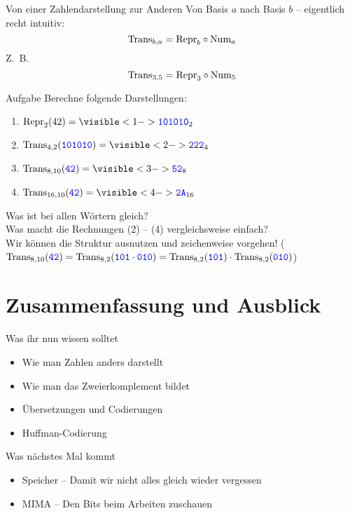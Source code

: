 \begin{frame}{Von einer Zahlendarstellung zur Anderen}
	\vspace{-.2\baselineskip}
	Von Basis $a$ nach Basis $b$ -- eigentlich recht intuitiv:
	$$\text{Trans}_{b,a} = \text{Repr}_b \circ {\text{Num}}_a$$
	Z.~B.
	$$\text{Trans}_{3,5} = \text{Repr}_3 \circ {\text{Num}}_5$$
	
	\begin{block}{Aufgabe}
		Berechne folgende Darstellungen:\\
		\begin{enumerate}[(1)]
			\item $\fRepr_2(42) = \visible<1->{ \word{101010}_2}$ 
			\item $\fTrans_{4,2}(\word{101010}) = \visible<2->{ \word{222}_4}$ 
			\item $\fTrans_{8,10}(\word{42}) = \visible<3->{ \word{52}_8}$ 
			\item $\fTrans_{16,10}(\word{42}) = \visible<4->{ \word{2A}_{16}}$
		\end{enumerate}
	\end{block}

	Was ist bei allen Wörtern gleich?  \\
	Was macht die Rechnungen (2) -- (4) vergleichsweise einfach? \pause[6] \\
	\impl Wir können die Struktur ausnutzen und zeichenweise vorgehen! ($\text{Trans}_{8,10}(\hbox{\textcolor{blue}{\texttt{42}}}) = \text{Trans}_{8,2}(\hbox{\textcolor{blue}{\texttt{101}}} \cdot \hbox{\textcolor{blue}{\texttt{010}}}) = \text{Trans}_{8,2}(\hbox{\textcolor{blue}{\texttt{101}}}) \cdot \text{Trans}_{8,2}(\hbox{\textcolor{blue}{\texttt{010}}})$)
\end{frame}





\appendix
\beginbackup

\section{Zusammenfassung und Ausblick}

\begin{frame}	
	\begin{block}{Was ihr nun wissen solltet}
		\begin{itemize}
			\item Wie man Zahlen anders darstellt
			\item Wie man das Zweierkomplement bildet
			\item Übersetzungen und Codierungen
			\item Huffman-Codierung
		\end{itemize}
	\end{block}
	
	\begin{block}{Was nächstes Mal kommt}
		\begin{itemize}
			\item Speicher -- Damit wir nicht alles gleich wieder vergessen
			\item MIMA -- Den Bits beim Arbeiten zuschauen
		\end{itemize}
	\end{block}
\end{frame}



